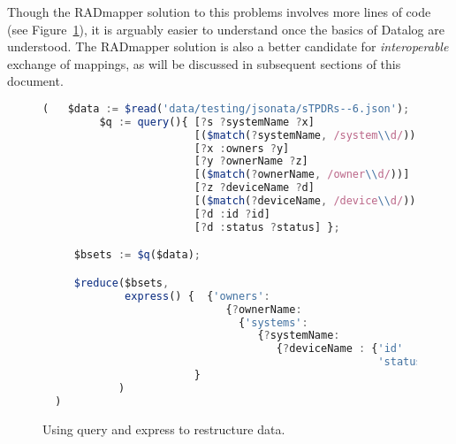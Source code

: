\documentclass[9pt,letterpaper]{article}
\begin{document}
Though the RADmapper solution to this problems involves more lines of code (see Figure~\ref{code:simple-restructuring}), it is arguably easier to understand once the basics of Datalog are understood.
The RADmapper solution is also a better candidate for \textit{interoperable} exchange of mappings, as will be discussed in subsequent sections of this document.

\begin{figure}[H]
\caption{Using query and express to restructure data.}
 \label{code:simple-restructuring}
\begin{lstlisting}[language=JavaScript,basicstyle=\ttfamily\scriptsize,numberstyle=\scriptsize]
  (   $data := $read('data/testing/jsonata/sTPDRs--6.json');
         $q := query(){ [?s ?systemName ?x]
                        [($match(?systemName, /system\\d/))]
                        [?x :owners ?y]
                        [?y ?ownerName ?z]
                        [($match(?ownerName, /owner\\d/))]
                        [?z ?deviceName ?d]
                        [($match(?deviceName, /device\\d/))]
                        [?d :id ?id]
                        [?d :status ?status] };

     $bsets := $q($data);

     $reduce($bsets,
             express() {  {'owners':
                             {?ownerName:
                               {'systems':
                                  {?systemName:
                                     {?deviceName : {'id'     : ?id,
                                                     'status' : ?status}}}}}}
                        }
            )
  )
\end{lstlisting}
\end{figure}
\end{document}
